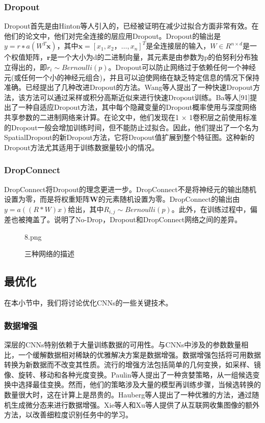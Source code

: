 \documentclass[final]{cvpr}
\begin{document}
\subsubsection{Dropout}
Dropout首先是由Hinton等人引入的，已经被证明在减少过拟合方面非常有效。在他们的论文中，他们对完全连接的层应用Dropout。Dropout的输出是$y = r∗a(W^T\bm{x})$，其中$\bm{x} = [x_1, x_2，…,x_n]^T$是全连接层的输入，$W\in R^{n\times d}$是一个权值矩阵，$\bm{r}$是一个大小为d的二进制向量，其元素是由参数为p的伯努利分布独立得出的，即$r_i\sim Bernoulli(p)$。Dropout可以防止网络过于依赖任何一个神经元(或任何一个小的神经元组合)，并且可以迫使网络在缺乏特定信息的情况下保持准确。已经提出了几种改进Dropout的方法。Wang等人提出了一种快速Dropout方法，该方法可以通过采样或积分高斯近似来进行快速Dropout训练。Ba等人[91]提出了一种自适应Dropout方法，其中每个隐藏变量的Dropout概率使用与深度网络共享参数的二进制网络来计算。在论文中，他们发现在1 × 1卷积层之前使用标准的Dropout一般会增加训练时间，但不能防止过拟合。因此，他们提出了一个名为SpatialDropout的新Dropout方法，它将Dropout值扩展到整个特征图。这种新的Dropout方法尤其适用于训练数据量较小的情况。
\subsubsection{DropConnect}
DropConnect将Dropout的理念更进一步。DropConnect不是将神经元的输出随机设置为零，而是将权重矩阵$\bm{W}$的元素随机设置为零。DropConnect的输出由$y=a((R*W)x)$给出，其中$R_{i,j}\sim Bernoulli(p)$。此外，在训练过程中，偏差也被掩盖了。说明了No-Drop，Dropout和DropConnect网络之间的差异。
\begin{figure}[t!]
	\begin{overpic}[width=\columnwidth]{8.png}
	\end{overpic}
	\caption{三种网络的描述
	}\label{fig:drop}
\end{figure}
\subsection{最优化}
在本小节中，我们将讨论优化CNNs的一些关键技术。
\subsubsection{数据增强}
深层的CNNs特别依赖于大量训练数据的可用性。与CNNs中涉及的参数数量相比，一个缓解数据相对稀缺的优雅解决方案是数据增强。数据增强包括将可用数据转换为新数据而不改变其性质。流行的增强方法包括简单的几何变换，如采样、镜像、旋转、移动和各种光度变换。Paulin等人提出了一种贪婪策略，从一组候选变换中选择最佳变换。然而，他们的策略涉及大量的模型再训练步骤，当候选转换的数量很大时，这在计算上是昂贵的。Hauberg等人提出了一种优雅的方法，通过随机生成微分态来进行数据增强。Xie等人和Xu等人提供了从互联网收集图像的额外方法，以改善细粒度识别任务中的学习。
\end{document}
